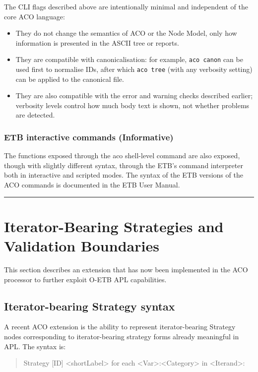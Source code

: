 \documentclass[11pt,twoside,a4paper]{article}
\begin{document}
The CLI flags described above are intentionally minimal and independent of the core ACO language:

\begin{itemize}[leftmargin=2em]
  \item They do not change the semantics of ACO or the Node Model, only how information is presented in the ASCII tree or reports.
  \item They are compatible with canonicalisation: for example, \texttt{aco canon} can be used first to normalise IDs, after which \texttt{aco tree} (with any verbosity setting) can be applied to the canonical file.
  \item They are also compatible with the error and warning checks described earlier; verbosity levels control how much body text is shown, not whether problems are detected.
\end{itemize}

\subsubsection*{ETB interactive commands (Informative)}

The functions exposed through the aco shell-level command are also exposed, though with slightly different syntax, through the ETB's command interpreter both in interactive and scripted modes.
The syntax of the ETB versions of the ACO commands is documented in the ETB User Manual.

\bigskip
\hrule
\bigskip

\clearpage
\section{Iterator-Bearing Strategies and Validation Boundaries}
\label{sec:iterator-bearing-strategies}

This section describes an extension that has now been implemented in the ACO processor to further exploit O-ETB APL capabilities.

\subsection{Iterator-bearing Strategy syntax}

A recent ACO extension is the ability to represent iterator-bearing Strategy nodes corresponding to iterator-bearing strategy forms already meaningful in APL.
The syntax is:
\begin{quote}\ttfamily
Strategy [ID] <shortLabel> for each <Var>:<Category> in <Iterand>:
\end{quote}
\end{document}

